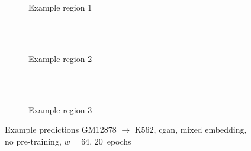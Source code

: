 \begin{figure}[p] %
    \begin{subfigure}{\textwidth}
        \centering
        \caption{Example  region 1} \label{fig:results:cGAN64_mixed_r1}
    \end{subfigure}\\[2mm]
    \\[3mm]
    \begin{subfigure}{\textwidth}
        \centering
        \caption{Example region 2} \label{fig:results:cGAN64_mixed_r2}
    \end{subfigure}\\[2mm]
    \\[3mm]
    \begin{subfigure}{\textwidth}
        \centering
        \caption{Example region 3} \label{fig:results:cGAN64_mixed_r3}
    \end{subfigure}
    \caption{Example predictions GM12878 $\rightarrow$ K562, \acrshort{cgan}, mixed embedding, no pre-training, $w=64$, 20~epochs} 
     \label{fig:results:GAN64_mixed_matrices}
\end{figure}

